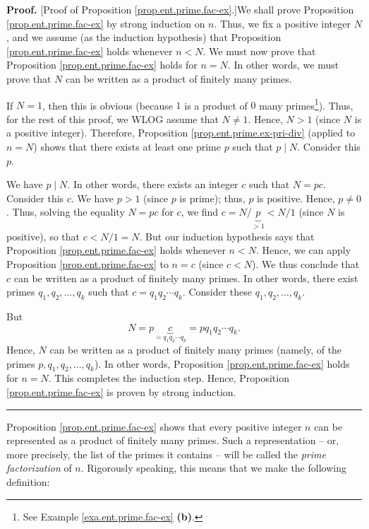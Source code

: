 \documentclass[numbers=enddot,12pt,final,onecolumn,notitlepage]{scrartcl}%
\numberwithin{exer}{subsection}
\theoremstyle{definition}
\newenvironment{proof}[1][Proof]{\noindent\textbf{#1.} }{\ \rule{0.5em}{0.5em}}
\begin{document}
\begin{proof}
[Proof of Proposition \ref{prop.ent.prime.fac-ex}.]We shall prove Proposition
\ref{prop.ent.prime.fac-ex} by strong induction on $n$. Thus, we fix a
positive integer $N$, and we assume (as the induction hypothesis) that
Proposition \ref{prop.ent.prime.fac-ex} holds whenever $n<N$. We must now
prove that Proposition \ref{prop.ent.prime.fac-ex} holds for $n=N$. In other
words, we must prove that $N$ can be written as a product of finitely many primes.

If $N=1$, then this is obvious (because $1$ is a product of $0$ many
primes\footnote{See Example \ref{exa.ent.prime.fac-ex} \textbf{(b)}.}). Thus,
for the rest of this proof, we WLOG assume that $N\neq1$. Hence, $N>1$ (since
$N$ is a positive integer). Therefore, Proposition
\ref{prop.ent.prime.ex-pri-div} (applied to $n=N$) shows that there exists at
least one prime $p$ such that $p\mid N$. Consider this $p$.

We have $p\mid N$. In other words, there exists an integer $c$ such that
$N=pc$. Consider this $c$. We have $p>1$ (since $p$ is prime); thus, $p$ is
positive. Hence, $p\neq0$. Thus, solving the equality $N=pc$ for $c$, we find
$c=N/\underbrace{p}_{>1}<N/1$ (since $N$ is positive), so that $c<N/1=N$. But
our induction hypothesis says that Proposition \ref{prop.ent.prime.fac-ex}
holds whenever $n<N$. Hence, we can apply Proposition
\ref{prop.ent.prime.fac-ex} to $n=c$ (since $c<N$). We thus conclude that $c$
can be written as a product of finitely many primes. In other words, there
exist primes $q_{1},q_{2},\ldots,q_{k}$ such that $c=q_{1}q_{2}\cdots q_{k}$.
Consider these $q_{1},q_{2},\ldots,q_{k}$.

But%
\[
N=p\underbrace{c}_{=q_{1}q_{2}\cdots q_{k}}=pq_{1}q_{2}\cdots q_{k}.
\]
Hence, $N$ can be written as a product of finitely many primes (namely, of the
primes $p,q_{1},q_{2},\ldots,q_{k}$). In other words, Proposition
\ref{prop.ent.prime.fac-ex} holds for $n=N$. This completes the induction
step. Hence, Proposition \ref{prop.ent.prime.fac-ex} is proven by strong induction.
\end{proof}

Proposition \ref{prop.ent.prime.fac-ex} shows that every positive integer $n$
can be represented as a product of finitely many primes. Such a representation
-- or, more precisely, the list of the primes it contains -- will be called
the \textit{prime factorization} of $n$. Rigorously speaking, this means that
we make the following definition:
\end{document}
